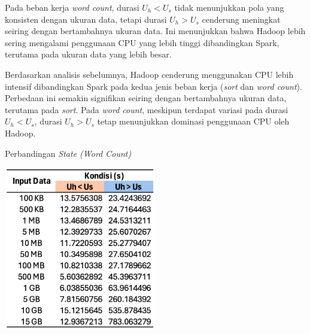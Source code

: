 Pada beban kerja \textit{word count}, durasi $U_h < U_s$ tidak menunjukkan pola yang konsisten dengan ukuran data, tetapi durasi $U_h > U_s$ cenderung meningkat seiring dengan bertambahnya ukuran data. Ini menunjukkan bahwa Hadoop lebih sering mengalami penggunaan CPU yang lebih tinggi dibandingkan Spark, terutama pada ukuran data yang lebih besar.

Berdasarkan analisis sebelumnya, Hadoop cenderung menggunakan CPU lebih intensif dibandingkan Spark pada kedua jenis beban kerja (\textit{sort} dan \textit{word count}). Perbedaan ini semakin signifikan seiring dengan bertambahnya ukuran data, terutama pada \textit{sort}. Pada \textit{word count}, meskipun terdapat variasi pada durasi $U_h < U_s$, durasi $U_h > U_s$ tetap menunjukkan dominasi penggunaan CPU oleh Hadoop. 

\begin{table}[h]
  \centering
  \caption{Perbandingan \textit{State  (Word Count)}}
  \includegraphics[width=0.5\textwidth]{figures/ch04/4-kondisi-wc}
  \label{fig:4-state-wordcount}
\end{table}


%

